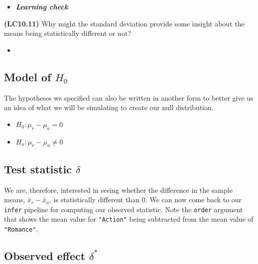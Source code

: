 \documentclass[12pt,]{krantz}
\makeatletter
\newenvironment{Shaded}{\begin{snugshade}}{\end{snugshade}}
\newcommand{\KeywordTok}[1]{\textcolor[rgb]{0.27,0.27,0.27}{\textbf{#1}}}
\newcommand{\DataTypeTok}[1]{\textcolor[rgb]{0.27,0.27,0.27}{#1}}
\newcommand{\StringTok}[1]{\textcolor[rgb]{0.5,0.5,0.5}{#1}}
\newcommand{\OperatorTok}[1]{\textcolor[rgb]{0.43,0.43,0.43}{\textbf{#1}}}
\newcommand{\NormalTok}[1]{#1}
\providecommand{\tightlist}{%
  \setlength{\itemsep}{0pt}\setlength{\parskip}{0pt}}
\newenvironment{kframe}{%
\medskip{}
\setlength{\fboxsep}{.8em}
 \def\at@end@of@kframe{}%
 \ifinner\ifhmode%
  \def\at@end@of@kframe{\end{minipage}}%
  \begin{minipage}{\columnwidth}%
 \fi\fi%
 \def\FrameCommand##1{\hskip\@totalleftmargin \hskip-\fboxsep
 \colorbox{shadecolor}{##1}\hskip-\fboxsep
     \hskip-\linewidth \hskip-\@totalleftmargin \hskip\columnwidth}%
 \MakeFramed {\advance\hsize-\width
   \@totalleftmargin\z@ \linewidth\hsize
   \@setminipage}}%
 {\par\unskip\endMakeFramed%
 \at@end@of@kframe}
\renewenvironment{Shaded}{\begin{kframe}}{\end{kframe}}
\newenvironment{rmdblock}[1]
  {\begin{shaded*}
  \begin{itemize}
  \renewcommand{\labelitemi}{
    \raisebox{-.7\height}[0pt][0pt]{
    }
  }
  \item
  }
  {
  \end{itemize}
  \end{shaded*}
  }
\newenvironment{learncheck}
  {\begin{rmdblock}{warning}}
  {\end{rmdblock}}
\makeatother
\begin{document}
\begin{learncheck}
\textbf{\emph{Learning check}}
\end{learncheck}

\textbf{(LC10.11)} Why might the standard deviation provide some insight
about the means being statistically different or not?

\begin{learncheck}

\end{learncheck}

\subsection{\texorpdfstring{Model of
\(H_0\)}{Model of H\_0}}\label{model-of-h_0}

The hypotheses we specified can also be written in another form to
better give us an idea of what we will be simulating to create our null
distribution.

\begin{itemize}
\tightlist
\item
  \(H_0: \mu_r - \mu_a = 0\)
\item
  \(H_a: \mu_r - \mu_a \ne 0\)
\end{itemize}

\subsection{\texorpdfstring{Test statistic
\(\delta\)}{Test statistic \textbackslash{}delta}}\label{test-statistic-delta}

We are, therefore, interested in seeing whether the difference in the
sample means, \(\bar{x}_r - \bar{x}_a\), is statistically different than
0. We can now come back to our \texttt{infer} pipeline for computing our
observed statistic. Note the \texttt{order} argument that shows the mean
value for \texttt{"Action"} being subtracted from the mean value of
\texttt{"Romance"}.

\subsection{\texorpdfstring{Observed effect
\(\delta^*\)}{Observed effect \textbackslash{}delta\^{}*}}\label{observed-effect-delta}

\begin{Shaded}
\end{Shaded}
\end{document}
